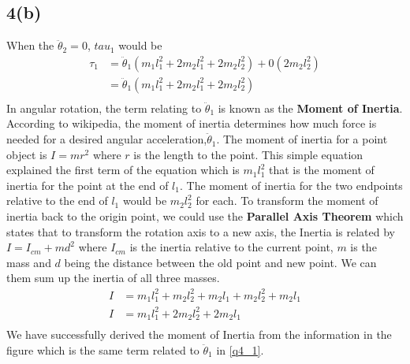\subsection*{4(b)}
When the $ \ddot{\theta}_2 = 0$, $tau_1$ would be
\begin{equation}\label{q4_1}
\begin{aligned}
\tau_1 &= \ddot{\theta}_1(m_1l_1^2 + 2 m_2 l_1^2 + 2 m_2 l_2^2) + 0(2 m_2 l_2^2)\\
&= \ddot{\theta}_1(m_1l_1^2 + 2 m_2 l_1^2 + 2 m_2 l_2^2)\\
\end{aligned}
\end{equation}
In angular rotation, the term relating to $\ddot{\theta}_1$ is known as the \textbf{Moment of Inertia}. According to wikipedia, the moment of inertia determines how much force is needed for a desired angular acceleration,$\ddot{\theta}_1$. The moment of inertia for a point object is $I = mr^2$ where $r$ is the length to the point. This simple equation explained the first term of the equation which is $m_1l_1^2$ that is the moment of inertia for the point at the end of $l_1$. The moment of inertia for the two endpoints relative to the end of $l_1$ would be $m_2l_2^2$ for each. To transform the moment of inertia back to the origin point, we could use the \textbf{Parallel Axis Theorem} which states that to transform the rotation axis to a new axis, the Inertia is related by $I = I_{cm} + md^2$ where $I_{cm}$ is the inertia relative to the current point, $m$ is the mass and $d$ being the distance between the old point and new point. We can them sum up the inertia of all three masses.
\begin{equation}
\begin{aligned}
I &= m_1l_1^2 + m_2l_2^2 + m_2l_1 + m_2l_2^2 + m_2l_1\\
I &= m_1l_1^2 + 2 m_2l_2^2 + 2 m_2l_1\\
\end{aligned}
\end{equation}
We have successfully derived the moment of Inertia from the information in the figure which is the same term related to $\ddot{\theta}_1$ in \ref{q4_1}.